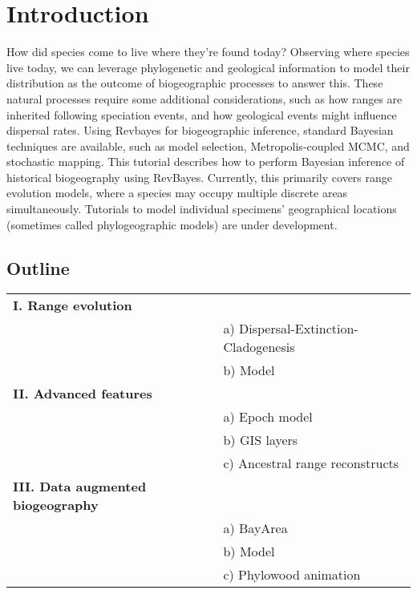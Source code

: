 \section{Introduction}

How did species come to live where they're found today?
Observing where species live today, we can leverage phylogenetic and geological information to model their distribution as the outcome of biogeographic processes to answer this.
These natural processes require some additional considerations, such as how ranges are inherited following speciation events, and how geological events might influence dispersal rates.
Using Revbayes for biogeographic inference, standard Bayesian techniques are available, such as model selection, Metropolis-coupled MCMC, and stochastic mapping.
This tutorial describes how to perform Bayesian inference of historical biogeography using RevBayes. 
Currently, this primarily covers range evolution models, where a species may occupy multiple discrete areas simultaneously.
Tutorials to model individual specimens' geographical locations (sometimes called phylogeographic models) are under development.

\subsection*{\textbf{Outline}}
\begin{tabular}{ll}
{\bf I. Range evolution} & \\
& a) Dispersal-Extinction-Cladogenesis \\
& b) Model \\
{\bf II. Advanced features} & \\
& a) Epoch model \\
& b) GIS layers \\
& c) Ancestral range reconstructs \\
{\bf III. Data augmented biogeography} & \\
& a) BayArea \\
& b) Model \\
& c) Phylowood animation \\
\end{tabular}

%

